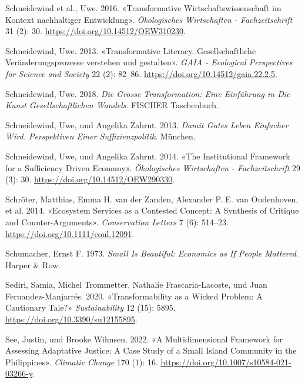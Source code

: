 \documentclass[
  nswissgerman,
  a4paper,
  DIV=11,
  numbers=noendperiod,
  oneside,
  openany]{scrreprt}
\newlength{\cslhangindent}
\newenvironment{CSLReferences}[2] %
 {\begin{list}{}{%
  \setlength{\itemindent}{0pt}
  \setlength{\leftmargin}{0pt}
  \setlength{\parsep}{0pt}
  \ifodd #1
   \setlength{\leftmargin}{\cslhangindent}
   \setlength{\itemindent}{-1\cslhangindent}
  \fi
  \setlength{\itemsep}{#2\baselineskip}}}
 {\end{list}}
\begin{document}
\begin{CSLReferences}{1}{1}
Schneidewind et al., Uwe. 2016. {«{Transformative
Wirtschaftswissenschaft im Kontext nachhaltiger Entwicklung}»}.
\emph{{Ö}kologisches Wirtschaften - Fachzeitschrift} 31 (2): 30.
\url{https://doi.org/10.14512/OEW310230}.

Schneidewind, Uwe. 2013. {«{Transformative Literacy. Gesellschaftliche
Ver{ä}nderungsprozesse verstehen und gestalten}»}. \emph{GAIA -
Ecological Perspectives for Science and Society} 22 (2): 82--86.
\url{https://doi.org/10.14512/gaia.22.2.5}.

Schneidewind, Uwe. 2018. \emph{Die {Grosse Transformation}: {Eine
Einf{ü}hrung} in Die {Kunst} Gesellschaftlichen {Wandels}}. FISCHER
Taschenbuch.

Schneidewind, Uwe, und Angelika Zahrnt. 2013. \emph{Damit Gutes {Leben}
Einfacher Wird. {Perspektiven} Einer {Suffizienzpolitik}}. München.

Schneidewind, Uwe, und Angelika Zahrnt. 2014. {«The Institutional
Framework for a Sufficiency Driven Economy»}. \emph{Ökologisches
Wirtschaften - Fachzeitschrift} 29 (3): 30.
\url{https://doi.org/10.14512/OEW290330}.

{Schröter, Matthias, Emma H. van der Zanden, Alexander P. E. van
Oudenhoven, et al.} 2014. {«Ecosystem {Services} as a {Contested
Concept}: A {Synthesis} of {Critique} and {Counter-Arguments}»}.
\emph{Conservation Letters} 7 (6): 514--23.
\url{https://doi.org/10.1111/conl.12091}.

Schumacher, Ernst F. 1973. \emph{Small Is {Beautiful}: {Economics} as If
{People Mattered}}. Harper \& Row.

Sediri, Samia, Michel Trommetter, Nathalie Frascaria-Lacoste, und Juan
Fernandez-Manjarrés. 2020. {«Transformability as a {Wicked Problem}: {A
Cautionary Tale}?»} \emph{Sustainability} 12 (15): 5895.
\url{https://doi.org/10.3390/su12155895}.

See, Justin, und Brooke Wilmsen. 2022. {«A Multidimensional Framework
for Assessing Adaptative Justice: A Case Study of a Small Island
Community in the {Philippines}»}. \emph{Climatic Change} 170 (1): 16.
\url{https://doi.org/10.1007/s10584-021-03266-y}.


\end{CSLReferences}
\end{document}
